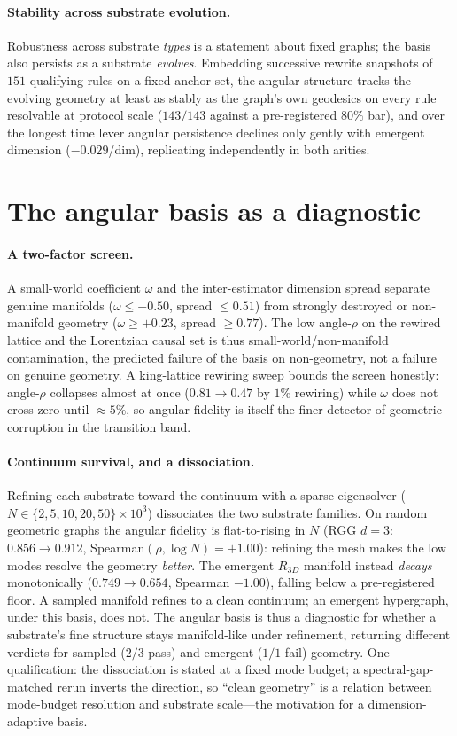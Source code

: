 \documentclass[11pt]{article}
\begin{document}
\paragraph{Stability across substrate evolution.} Robustness across substrate \emph{types}
is a statement about fixed graphs; the basis also persists as a substrate \emph{evolves}.
Embedding successive rewrite snapshots of $151$ qualifying rules on a fixed anchor set, the
angular structure tracks the evolving geometry at least as stably as the graph's own
geodesics on every rule resolvable at protocol scale ($143/143$ against a pre-registered
$80\%$ bar), and over the longest time lever angular persistence declines only gently with
emergent dimension ($-0.029$/dim), replicating independently in both arities.

\section{The angular basis as a diagnostic}\label{sec:diagnostic}
\paragraph{A two-factor screen.} A small-world coefficient $\omega$ and the
inter-estimator dimension spread separate genuine manifolds ($\omega\le-0.50$, spread
$\le0.51$) from strongly destroyed or non-manifold geometry ($\omega\ge+0.23$, spread
$\ge0.77$). The low angle-$\rho$ on the rewired lattice and the Lorentzian causal set is
thus small-world/non-manifold contamination, the predicted failure of the basis on
non-geometry, not a failure on genuine geometry. A king-lattice rewiring sweep bounds the
screen honestly: angle-$\rho$ collapses almost at once ($0.81\to0.47$ by $1\%$ rewiring)
while $\omega$ does not cross zero until $\approx5\%$, so angular fidelity is itself the
finer detector of geometric corruption in the transition band.

\paragraph{Continuum survival, and a dissociation.} Refining each substrate toward the
continuum with a sparse eigensolver ($N\in\{2,5,10,20,50\}\times10^3$) dissociates the two
substrate families. On random geometric graphs the angular fidelity is flat-to-rising in
$N$ (RGG $d{=}3$: $0.856\to0.912$, Spearman$(\rho,\log N)=+1.00$): refining the mesh makes
the low modes resolve the geometry \emph{better}. The emergent $R_{3D}$ manifold instead
\emph{decays} monotonically ($0.749\to0.654$, Spearman $-1.00$), falling below a
pre-registered floor. A sampled manifold refines to a clean continuum; an emergent
hypergraph, under this basis, does not. The angular basis is thus a diagnostic for whether
a substrate's fine structure stays manifold-like under refinement, returning different
verdicts for sampled ($2/3$ pass) and emergent ($1/1$ fail) geometry. One qualification:
the dissociation is stated at a fixed mode budget; a spectral-gap-matched rerun inverts the
direction, so ``clean geometry'' is a relation between mode-budget resolution and substrate
scale---the motivation for a dimension-adaptive basis.
\end{document}
